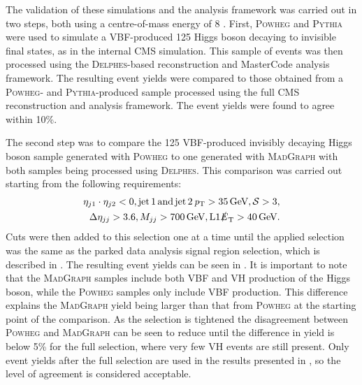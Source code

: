 The validation of these simulations and the analysis framework was carried out in two steps, both using a centre-of-mass energy of 8 \TeV. First, \textsc{Powheg} and \textsc{Pythia} were used to simulate a \ac{VBF}-produced 125 \GeV Higgs boson decaying to invisible final states, as in the internal CMS simulation. This sample of events was then processed using the \textsc{Delphes}-based reconstruction and MasterCode analysis framework. The resulting event yields were compared to those obtained from a \textsc{Powheg}- and \textsc{Pythia}-produced sample processed using the full CMS reconstruction and analysis framework. The event yields were found to agree within 10\%.


The second step was to compare the 125 \GeV \ac{VBF}-produced invisibly decaying Higgs boson sample generated with \textsc{Powheg} to one generated with \textsc{MadGraph} with both samples being processed using \textsc{Delphes}. This comparison was carried out starting from the following requirements:
\begin{align}
  \label{eq:dmvalstart}
  \begin{split}
\eta_{j1}\cdot\eta_{j2}<0, \rm{jet\,1\,and\,jet\,2\,}\mathit{p}_{\mathrm{T}}>35 \,\text{Ge\hspace{-.08em}V}, \mathcal{S}>3,\\ \Delta\eta_{jj}>3.6, M_{jj}>700 \,\text{Ge\hspace{-.08em}V}, \rm{L1} \slashed{E}_{\mathrm{T}}>40 \,\text{Ge\hspace{-.08em}V}.
  \end{split}
\end{align}
Cuts were then added to this selection one at a time until the applied selection was the same as the parked data analysis signal region selection, which is described in . The resulting event yields can be seen in . It is important to note that the \textsc{MadGraph} samples include both \ac{VBF} and \ac{VH} production of the Higgs boson, while the \textsc{Powheg} samples only include \ac{VBF} production. This difference explains the \textsc{MadGraph} yield being larger than that from \textsc{Powheg} at the starting point of the comparison. As the selection is tightened the disagreement between \textsc{Powheg} and \textsc{MadGraph} can be seen to reduce until the difference in yield is below 5\% for the full selection, where very few \ac{VH} events are still present. Only event yields after the full selection are used in the results presented in , so the level of agreement is considered acceptable.

